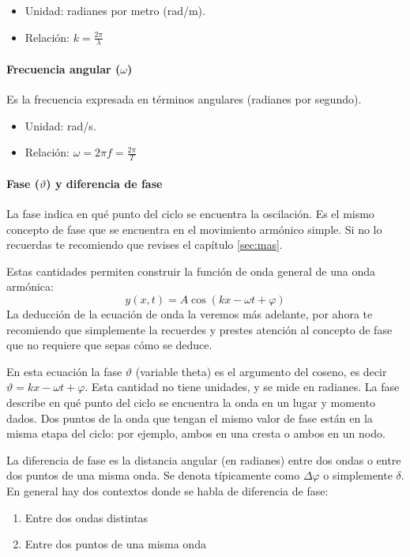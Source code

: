 \begin{itemize}
  \item Unidad: radianes por metro (rad/m).
  \item Relación: \(k = \frac{2\pi}{\lambda}\)
\end{itemize}

\paragraph{Frecuencia angular (\(\omega\))}

Es la frecuencia expresada en términos angulares (radianes por segundo).

\begin{itemize}
  \item Unidad: rad/s.
  \item Relación: \(\omega = 2\pi f = \frac{2\pi}{T}\)
\end{itemize}

\paragraph{Fase (\(\vartheta\)) y diferencia de fase}

La fase indica en qué punto del ciclo se encuentra la oscilación. Es el mismo concepto de fase que se encuentra en el movimiento armónico simple. Si no lo recuerdas te recomiendo que revises el capítulo \ref{sec:mas}.

Estas cantidades permiten construir la función de onda general de una onda armónica:
\[
y(x, t) = A \cos(kx - \omega t + \varphi)
\]
La deducción de la ecuación de onda la veremos más adelante, por ahora te recomiendo que simplemente la recuerdes y prestes atención al concepto de fase que no requiere que sepas cómo se deduce.

En esta ecuación la fase \(\vartheta\) (variable theta) es el argumento del coseno, es decir \(\vartheta = kx - \omega t + \varphi\). Esta cantidad no tiene unidades, y se mide en radianes. La fase describe en qué punto del ciclo se encuentra la onda en un lugar y momento dados. Dos puntos de la onda que tengan el mismo valor de fase están en la misma etapa del ciclo: por ejemplo, ambos en una cresta o ambos en un nodo.

La diferencia de fase es la distancia angular (en radianes) entre dos ondas o entre dos puntos de una misma onda. Se denota típicamente como \(\Delta \varphi\) o simplemente \(\delta\). En general hay dos contextos donde se habla de diferencia de fase:
\begin{enumerate}
  \item Entre dos ondas distintas
  \item Entre dos puntos de una misma onda
\end{enumerate}

